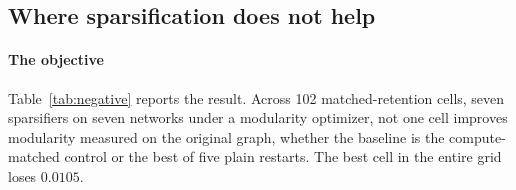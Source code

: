 %

\subsection{Where sparsification does not help}\label{sec:experiments:negative}

\paragraph{The objective}

Table~\ref{tab:negative} reports the result. Across 102 matched-retention cells,
seven sparsifiers on seven networks under a modularity optimizer, not one cell
improves modularity measured on the original graph, whether the baseline is the
compute-matched control or the best of five plain restarts. The best cell in the
entire grid loses $0.0105$.


